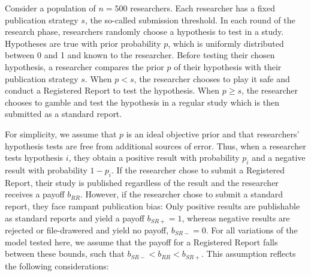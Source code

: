 \documentclass[
  ,man,mask,floatsintext]{apa6}
\begin{document}
Consider a population of \(n = 500\) researchers.
Each researcher has a fixed publication strategy \(s\), the so-called submission threshold.
In each round of the research phase, researchers randomly choose a hypothesis to test in a study.
Hypotheses are true with prior probability \(p\), which is uniformly distributed between 0 and 1 and known to the researcher.
Before testing their chosen hypothesis, a researcher compares the prior \(p\) of their hypothesis with their publication strategy \(s\).
When \(p < s\), the researcher chooses to play it safe and conduct a Registered Report to test the hypothesis.
When \(p \geq s\), the researcher chooses to gamble and test the hypothesis in a regular study which is then submitted as a standard report.

For simplicity, we assume that \(p\) is an ideal objective prior and that researchers' hypothesis tests are free from additional sources of error.
Thus, when a researcher tests hypothesis \(i\), they obtain a positive result with probability \(p_i\) and a negative result with probability \(1-p_i\).
If the researcher chose to submit a Registered Report, their study is published regardless of the result and the researcher receives a payoff \(b_{RR}\).
However, if the researcher chose to submit a standard report, they face rampant publication bias:
Only positive results are publishable as standard reports and yield a payoff \(b_{SR+} = 1\), whereas negative results are rejected or file-drawered and yield no payoff, \(b_{SR-} = 0\).
For all variations of the model tested here, we assume that the payoff for a Registered Report falls between these bounds, such that \(b_{SR-} < b_{RR} < b_{SR+}\).
This assumption reflects the following considerations:
\end{document}
